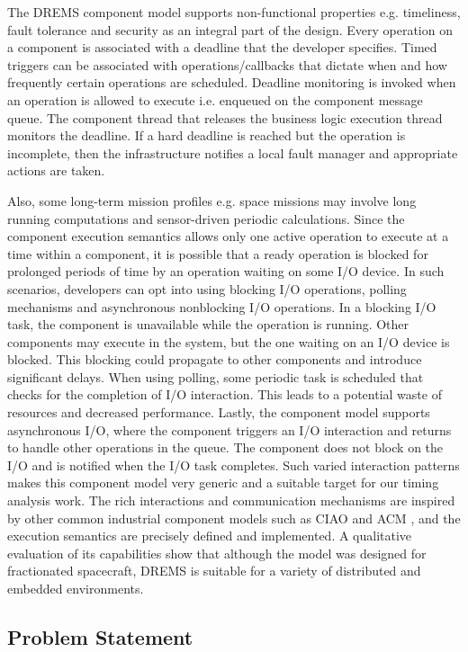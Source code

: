 The DREMS component model supports non-functional properties e.g. timeliness, fault tolerance and security as an integral part of the design. Every operation on a component is associated with a deadline that the developer specifies. Timed triggers can be associated with operations/callbacks that dictate when and how frequently certain operations are scheduled. Deadline monitoring is invoked when an operation is allowed to execute i.e. enqueued on the component message queue. The component thread that releases the business logic execution thread monitors the deadline. If a hard deadline is reached but the operation is incomplete, then the infrastructure notifies a local fault manager and appropriate actions are taken. 

Also, some long-term mission profiles e.g. space missions may involve long running computations and sensor-driven periodic calculations. Since the component execution semantics allows only one active operation to execute at a time within a component, it is possible that a ready operation is blocked for prolonged periods of time by an operation waiting on some I/O device. In such scenarios, developers can opt into using blocking I/O operations, polling mechanisms and asynchronous nonblocking I/O operations. In a blocking I/O task, the component is unavailable while the operation is running. Other components may execute in the system, but the one waiting on an I/O device is blocked. This blocking could propagate to other components and introduce significant delays. When using polling, some periodic task is scheduled that checks for the completion of I/O interaction. This leads to a potential waste of resources and decreased performance. Lastly, the component model supports asynchronous I/O, where the component triggers an I/O interaction and returns to handle other operations in the queue. The component does not block on the I/O and is notified when the I/O task completes. Such varied interaction patterns makes this component model very generic and a suitable target for our timing analysis work. The rich interactions and communication mechanisms are inspired by other common industrial component models such as CIAO \cite{CIAO_Chap:04} and ACM \cite{ACM_SPE:10}, and the execution semantics are precisely defined and implemented. A qualitative evaluation of its capabilities \cite{ISIS_F6_ISORC:13} show that although the model was designed for fractionated spacecraft, DREMS is suitable for a variety of distributed and embedded environments. 

\newpage
\subsection{Problem Statement}

